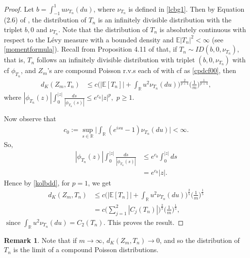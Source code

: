 \documentclass[12pt, a4paper,reqno]{amsart}
\theoremstyle{definition}
\theoremstyle{myremark}
\newtheorem{rem}[thm]{Remark}
\numberwithin{equation}{section}
\begin{document}
\vfill
\begin{proof}
	Let $b=\int_{-1}^{1}u\nu_{T_n}(du)$, where $\nu_{T_n}$ is defined in \eqref{lcbg1}. Then by Equation (2.6) of \cite{k0}, the distribution of $T_n$ is an infinitely divisible distribution with the triplet $b,0$ and $\nu_{T_n}$. Note that the distribution of $T_n$ is absolutely continuous with respect to the L\'evy measure with a bounded density and $\mathbb{E}|T_n|^2 < \infty$ (see \eqref{momentformula}). Recall from Proposition 4.11 of \cite{k0} that, if $T_n\sim ID(b,0,\nu_{T_n})$, that is, $T_n$ follows an infinitely divisible distribution with triplet $(b,0,\nu_{T_n})$ with cf $\phi_{T_n}$, and $Z_m$'s are compound Poisson r.v.s each of with cf as \eqref{cpdcf00}, then
	\begin{align}\label{kolbdd}
	d_{K}(Z_m,T_n)&\leq c\bigg( |\mathbb{E}[T_n]|+\int_{\mathbb{R}}u^2\nu_{T_n}(du)  \bigg)^{\frac{2}{p+4}}\bigg(\frac{1}{m}\bigg)^{\frac{1}{p+4}},
	\end{align}
	\noindent
	where $|\phi_{T_n}(z)| \displaystyle\int_{0}^{|z|}\frac{ds}{|\phi_{T_n}(s)|} \leq e^{c_0} |z|^p,$ $p\geq 1$.
	
	\noindent
	Now observe that
	\begin{align*}
		c_0:=\sup_{s\in\mathbb{R}}\bigg|\displaystyle\int_{\mathbb{{R}}}(e^{isu} -1)\nu_{T_n}(du)  \bigg|< \infty.
	\end{align*}
	\noindent
	So,
	\begin{align*}
	|\phi_{T_n}(z)| \displaystyle\int_{0}^{|z|}\frac{ds}{|\phi_{T_n}(s)|}
	&\leq e^{c_0} \displaystyle\int_{0}^{|z|}ds\\
	&=e^{c_0}|z|.
	\end{align*}
	\noindent
	Hence by \eqref{kolbdd}, for $p=1$, we get
	\begin{align*}
	d_{K}(Z_m,T_n)&\leq c\bigg( |\mathbb{E}[T_n]|+\int_{\mathbb{R}}u^2\nu_{T_n}(du)  \bigg)^{\frac{2}{5}}\bigg(\frac{1}{m}\bigg)^{\frac{1}{5}}\\
	&= c \bigg(\sum_{j=1}^{2}|C_{j}(T_n)|\bigg)^{\frac{2}{5}} \bigg(\frac{1}{m}\bigg)^{\frac{1}{5}}, 
	\end{align*}
	\noindent
	$\text{ since }\int_{\mathbb{R}}u^2\nu_{T_n}(du)=C_2(T_n).$ This proves the result.
\end{proof}
\begin{rem}
Note that if $m \to \infty$, $d_{K}(Z_m,T_n)\to 0$, and so the distribution of $T_n$ is the limit of a compound Poisson distributions. 
\end{rem}
\vspace*{-0.7cm}
\end{document}
